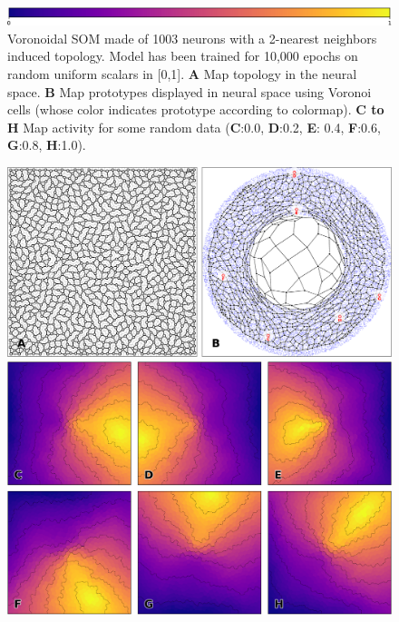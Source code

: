 \begin{figure}
  \includegraphics[width=\columnwidth]{figures/colormap.pdf}
  
  \caption{Voronoidal SOM made of 1003 neurons with a 2-nearest neighbors
    induced topology. Model has been trained for 10,000 epochs on random
    uniform scalars in [0,1]. \textbf{A} Map topology in the neural
    space. \textbf{B} Map prototypes displayed in neural space using Voronoi
    cells (whose color indicates prototype according to colormap). \textbf{C to
      H} Map activity for some random data (\textbf{C}:0.0, \textbf{D}:0.2,
    \textbf{E}: 0.4, \textbf{F}:0.6, \textbf{G}:0.8, \textbf{H}:1.0).}
\end{figure}

\begin{figure}
  \includegraphics[width=\columnwidth]{figures/vsom-spatial-1.pdf}

  \vspace{2mm}
  
  \includegraphics[width=\columnwidth]{figures/vsom-spatial-2.pdf}


\end{figure}
